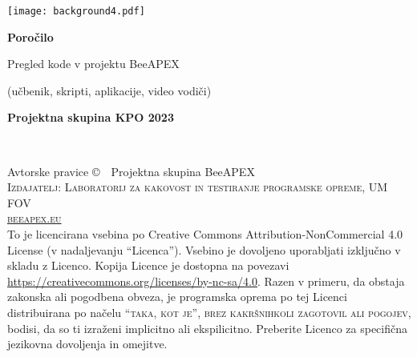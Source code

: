 \documentclass[
	11pt, %
	fleqn, %
	a4paper, %
]{bookSI}
\begin{document}


\titlepage %
	{\texttt{[image: background4.pdf]}} %
	{ %
		\centering\sffamily %
		{\Huge\bfseries Poročilo \par Pregled kode v projektu BeeAPEX\par} %
		\vspace{16pt} %
		{\LARGE (učbenik, skripti, aplikacije, video vodiči)\par} %
		\vspace{24pt} %
		{\huge\bfseries Projektna skupina KPO 2023\par} %
	}


\thispagestyle{empty} %

~\vfill %

\noindent Avtorske pravice \copyright\ \the\year\, Projektna skupina BeeAPEX\\ %

\noindent \textsc{Izdajatelj: Laboratorij za kakovost in testiranje programske opreme, UM FOV}\\ %

\noindent \textsc{\href{https://beeapex.eu}{beeapex.eu}}\\ %

\noindent To je licencirana vsebina po Creative Commons Attribution-NonCommercial 4.0 License (v nadaljevanju ``Licenca''). Vsebino je dovoljeno uporabljati izključno v skladu z Licenco. Kopija Licence je dostopna na povezavi \url{https://creativecommons.org/licenses/by-nc-sa/4.0}. Razen v primeru, da obstaja zakonska ali pogodbena obveza, je programska oprema po tej Licenci distribuirana po načelu \textsc{``taka, kot je'', brez kakršnihkoli zagotovil ali pogojev}, bodisi, da so ti izraženi implicitno ali ekspilicitno. Preberite Licenco za specifična jezikovna dovoljenja in omejitve.\\
\end{document}

